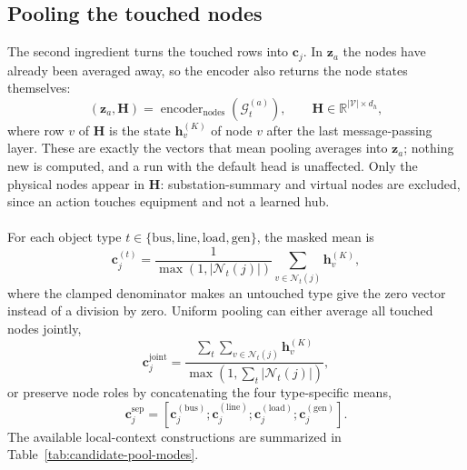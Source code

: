 \subsection{Pooling the touched nodes}
\label{subsec:candidate-pooling}

The second ingredient turns the touched rows into $\mathbf{c}_j$. In
$\mathbf{z}_a$ the nodes have already been averaged away, so the encoder also
returns the node states themselves:
\begin{equation}
  (\mathbf{z}_a,\mathbf{H})
  = \operatorname{encoder}_{\mathrm{nodes}}(\mathcal{G}^{(a)}_t),
  \qquad
  \mathbf{H}\in\mathbb{R}^{|\mathcal{V}|\times d_h},
  \label{eq:forward-with-nodes}
\end{equation}
where row $v$ of $\mathbf{H}$ is the state $\mathbf{h}^{(K)}_v$ of node $v$
after the last message-passing layer. These are exactly the vectors that mean
pooling averages into $\mathbf{z}_a$; nothing new is computed, and a run with
the default head is unaffected. Only the physical nodes appear in $\mathbf{H}$:
substation-summary and virtual nodes are excluded, since an action touches
equipment and not a learned hub.
\\
\\
For each object type $t\in\{\mathrm{bus},\mathrm{line},\mathrm{load},
\mathrm{gen}\}$, the masked mean is
\begin{equation}
  \mathbf{c}^{(t)}_j =
  \frac{1}{\max\left(1,|\mathcal{N}_t(j)|\right)}
  \sum_{v\in\mathcal{N}_t(j)}\mathbf{h}^{(K)}_v,
  \label{eq:candidate-typed-mean}
\end{equation}
where the clamped denominator makes an untouched type give the zero vector
instead of a division by zero. Uniform pooling can either average all touched
nodes jointly,
\begin{equation}
  \mathbf{c}^{\mathrm{joint}}_j =
  \frac{\sum_t\sum_{v\in\mathcal{N}_t(j)}\mathbf{h}^{(K)}_v}
       {\max\left(1,\sum_t|\mathcal{N}_t(j)|\right)},
  \label{eq:candidate-joint-mean}
\end{equation}
or preserve node roles by concatenating the four type-specific means,
\begin{equation}
  \mathbf{c}^{\mathrm{sep}}_j =
  \left[\mathbf{c}^{(\mathrm{bus})}_j;
        \mathbf{c}^{(\mathrm{line})}_j;
        \mathbf{c}^{(\mathrm{load})}_j;
        \mathbf{c}^{(\mathrm{gen})}_j\right].
  \label{eq:candidate-separated-mean}
\end{equation}
The available local-context constructions are summarized in
Table~\ref{tab:candidate-pool-modes}.

